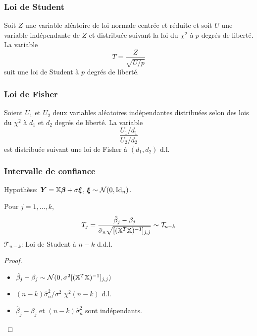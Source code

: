 \begin{frame}
\frametitle{Loi de Student}
\begin{definition}
Soit $Z$ une variable aléatoire de loi normale centrée et réduite et soit $U$ une variable indépendante de $Z$ et distribuée suivant la loi du
$\chi^2$ à $p$ degrés de liberté. La variable
\[
T = \frac{Z}{\sqrt{U/p}}
\]
suit une loi de Student à $p$ degrés de liberté.
\end{definition}
\end{frame}

\begin{frame}
\frametitle{Loi de Fisher}
\begin{definition}
 Soient $U_1$ et  $U_2$ deux variables aléatoires indépendantes distribuées  selon des lois du $\chi^2$ à $d_1$ et $d_2$ degrés de liberté. La variable
\[
 \frac{U_1/d_1}{U_2/d_2}
\]
est distribuée suivant une loi de Fisher à $(d_1,d_2)$ d.l.
\end{definition}
\end{frame}

\begin{frame}
\frametitle{Intervalle de confiance}
\begin{theo}
\alert{Hypothèse:} $\operatorname{\boldsymbol{Y}}= \mathbb{X} \boldsymbol{\beta} + \sigma \boldsymbol{\xi}$, $\boldsymbol{\xi} \sim \mathcal{N}(0,\mathrm{Id}_{n})$.

Pour $j=1,\dots,k$,
\[
T_j= \frac{\hat{\beta}_j- \beta_j}{\hat{\sigma}_n\sqrt{[(\mathbb{X}^T \mathbb{X})^{-1}]_{j,j}}} \sim  \mathcal{T}_{n-k}
\]
$\mathcal{T}_{n-k}$: Loi de \alert{Student} à $n-k$ d.d.l.
\end{theo}
\begin{proof}
\begin{itemize}
\item $\hat{\beta}_j- \beta_j \sim \mathcal{N}(0, \sigma^2[(\mathbb{X}^T \mathbb{X})^{-1}]_{j,j})$
\item $(n-k) \hat{\sigma}_n^2/\sigma^2$ $\chi^2(n-k)$ d.l.
\item $\hat{\beta}_j- \beta_j$ et $(n-k) \hat{\sigma}_n^2$ sont indépendants.
\end{itemize}
\end{proof}
\end{frame}

